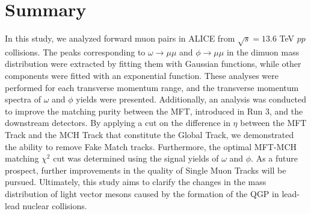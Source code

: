\section{Summary}
    In this study, we analyzed forward muon pairs in ALICE from $\sqrt{s} = 13.6$ TeV $pp$ collisions. The peaks corresponding to $\omega \rightarrow \mu\mu$ and $\phi \rightarrow \mu\mu$ in the dimuon mass distribution were extracted by fitting them with Gaussian functions, while other components were fitted with an exponential function. These analyses were performed for each transverse momentum range, and the transverse momentum spectra of $\omega$ and $\phi$ yields were presented. Additionally, an analysis was conducted to improve the matching purity between the MFT, introduced in Run 3, and the downstream detectors. By applying a cut on the difference in $\eta$ between the MFT Track and the MCH Track that constitute the Global Track, we demonstrated the ability to remove Fake Match tracks. Furthermore, the optimal MFT-MCH matching $\chi^2$ cut was determined using the signal yields of $\omega$ and $\phi$. As a future prospect, further improvements in the quality of Single Muon Tracks will be pursued. Ultimately, this study aims to clarify the changes in the mass distribution of light vector mesons caused by the formation of the QGP in lead-lead nuclear collisions.